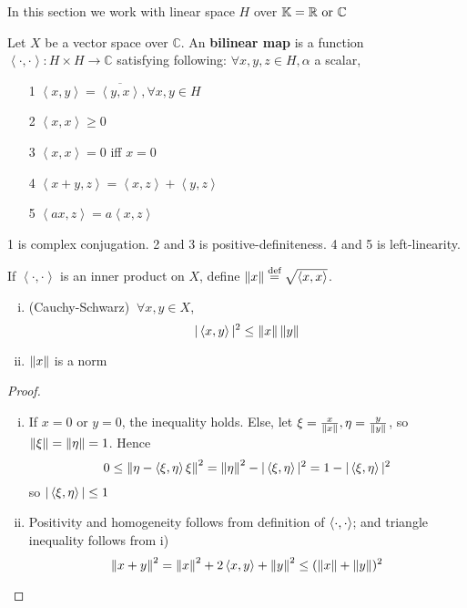 \documentclass{article}
\begin{document}
In this section we work with linear space $H$ over $\mathbb{K} = \real \ \textrm{or} \ \mathbb{ C}$

\begin{definition}
\nextline
	Let $X$ be a vector space over $\mathbb C$. An {\bf bilinear map} is a function $\left<\cdot,\cdot\right>:H \times H \xrightarrow{}{\mathbb C}$ satisfying following: $\forall x,y,z\in H,\alpha$ a scalar,
	\begin{itemize}
		\item[1] $\left<x,y\right>={\overline{\left<y,x\right>}},\forall x,y\in H$
		\item[2] $\left<x,x\right>\geq0$
		\item[3] $\left<x,x\right>=0$ iff $x=0$
		\item[4] $\left<x+y,z\right>=\left<x,z\right>+\left<y,z\right>$
		\item[5] $\left<ax,z\right>=a\left<x,z\right>$
	\end{itemize}
\end{definition}
1 is complex conjugation. 2 and 3 is positive-definiteness. 4 and 5 is left-linearity.


\begin{theorem}
	If $\left<\cdot,\cdot\right>$ is an inner product on $X$, define $\left\|{x}\right\|\overset{\textrm{def}}{=}\sqrt{\left<{x},{x}\right>}$.  
	\begin{enumerate}[i)]
	    \item (Cauchy-Schwarz) $\ \forall x,y\in X$,
	$$|\left<{x},{y}\right>|^2\leq \left\|{x}\right\| \left\|{y}\right\|$$
	\item $\left\|{x}\right\|$ is a norm
\end{enumerate}  
\end{theorem}

\begin{proof}
\begin{enumerate}[i)]
    \item If $x=0$ or $y=0$, the inequality holds. Else, let $\xi = \frac{x}{\left\|{x}\right\|}, \eta = \frac{y}{\left\|{y}\right\|}$, so $\left\|{\xi}\right\|=\left\|{\eta}\right\|=1$. Hence 
    $$0 \leq \left\|{\eta-\left<{\xi},{\eta}\right>\xi}\right\|^2=\left\|{\eta}\right\|^2 - |\left<{\xi},{\eta}\right>|^2=1-|\left<{\xi},{\eta}\right>|^2$$  
    so $|\left<{\xi},{\eta}\right>| \leq 1$
    \item Positivity and homogeneity follows from definition of $\left<{\cdot},{\cdot}\right>$; and triangle inequality follows from i)  
    $$
    \left\|{x+y}\right\|^2=\left\|{x}\right\|^2 + 2 \left<{x},{y}\right> + \left\|{y}\right\|^2 \leq (\left\|{x}\right\|+\left\|{y}\right\|)^2
    $$
\end{enumerate}
\end{proof}
\end{document}
